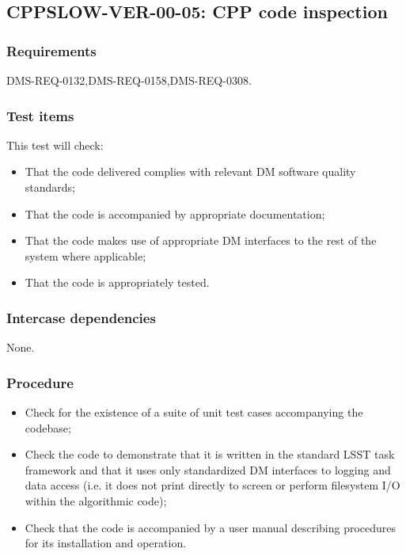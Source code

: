 \subsection{CPPSLOW-VER-00-05: CPP code inspection}
\label{cppslow-ver-00-05}

\subsubsection{Requirements}

DMS-REQ-0132,DMS-REQ-0158,DMS-REQ-0308.

\subsubsection{Test items}

This test will check:

\begin{itemize}

  \item{That the code delivered complies with relevant DM software quality
  standards;}

  \item{That the code is accompanied by appropriate documentation;}

  \item{That the code makes use of appropriate DM interfaces to the rest of
  the system where applicable;}

  \item{That the code is appropriately tested.}
\end{itemize}

\subsubsection{Intercase dependencies}

None.

\subsubsection{Procedure}

\begin{itemize}

  \item{Check for the existence of a suite of unit test cases accompanying the
  codebase;}

  \item{Check the code to demonstrate that it is written in the standard LSST
  task framework and that it uses only standardized DM interfaces to logging
  and data access (i.e. it does not print directly to screen or perform
  filesystem I/O within the algorithmic code);}

  \item{Check that the code is accompanied by a user manual describing
  procedures for its installation and operation.}

\end{itemize}
